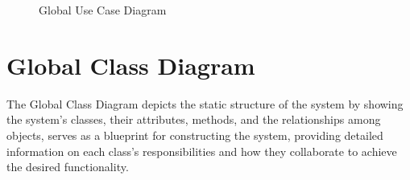 \begin{figure}[h]
    \centering
    \caption{Global Use Case Diagram}
    \label{fig:global-use-case}
\end{figure}

\section{Global Class Diagram}
The Global Class Diagram \cite{classdiagram} depicts the static structure of the system by showing the system's classes, their attributes, methods, and the relationships among objects, serves as a blueprint for constructing the system, providing detailed information on each class's responsibilities and how they collaborate to achieve the desired functionality.


